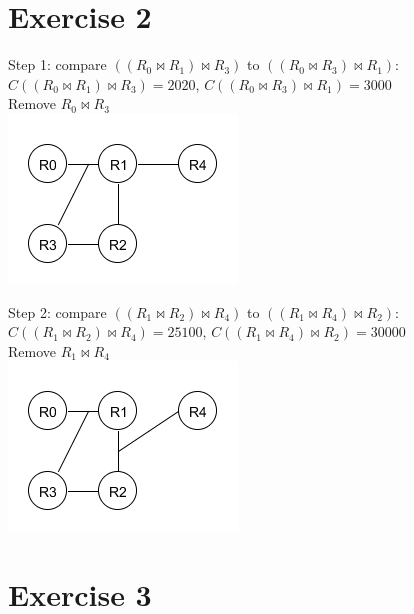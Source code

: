 \documentclass[11pt,a4paper]{scrartcl}
\begin{document}
\section*{Exercise 2}

Step 1: compare $((R_0 \Join R_1) \Join R_3)$ to $((R_0 \Join R_3) \Join R_1)$:\\
$C((R_0 \Join R_1) \Join R_3)=2020$, $C((R_0 \Join R_3) \Join R_1)=3000$\\
Remove $R_0 \Join R_3$\\
\includegraphics{graph/step1}

Step 2: compare $((R_1 \Join R_2) \Join R_4)$ to $((R_1 \Join R_4) \Join R_2)$:\\
$C((R_1 \Join R_2) \Join R_4)=25100$, $C((R_1 \Join R_4) \Join R_2)=30000$\\
Remove $R_1 \Join R_4$\\
\includegraphics{graph/step2}


\section*{Exercise 3}
\end{document}
